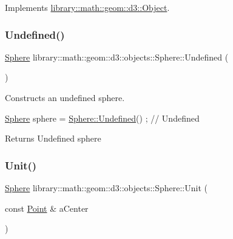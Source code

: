 Implements \hyperlink{classlibrary_1_1math_1_1geom_1_1d3_1_1_object_aa166f4ce4d116a248f0fc861c75012ca}{library\+::math\+::geom\+::d3\+::\+Object}.

\mbox{\label{classlibrary_1_1math_1_1geom_1_1d3_1_1objects_1_1_sphere_a777600f8814a2879e925909f30cfe9c4}} 
\subsubsection{\texorpdfstring{Undefined()}{Undefined()}}
{\footnotesize\ttfamily \hyperlink{classlibrary_1_1math_1_1geom_1_1d3_1_1objects_1_1_sphere}{Sphere} library\+::math\+::geom\+::d3\+::objects\+::\+Sphere\+::\+Undefined (\begin{DoxyParamCaption}{ }\end{DoxyParamCaption})\hspace{0.3cm}{\ttfamily [static]}}



Constructs an undefined sphere. 


\begin{DoxyCode}
\hyperlink{classlibrary_1_1math_1_1geom_1_1d3_1_1objects_1_1_sphere_a55dccc8ea16ee55cd7694c26afa8ea39}{Sphere} sphere = \hyperlink{classlibrary_1_1math_1_1geom_1_1d3_1_1objects_1_1_sphere_a777600f8814a2879e925909f30cfe9c4}{Sphere::Undefined}() ; \textcolor{comment}{// Undefined}
\end{DoxyCode}


\begin{DoxyReturn}{Returns}
Undefined sphere 
\end{DoxyReturn}
\mbox{\label{classlibrary_1_1math_1_1geom_1_1d3_1_1objects_1_1_sphere_a5464ea9145425db63dedbd896d6c97b0}} 
\subsubsection{\texorpdfstring{Unit()}{Unit()}}
{\footnotesize\ttfamily \hyperlink{classlibrary_1_1math_1_1geom_1_1d3_1_1objects_1_1_sphere}{Sphere} library\+::math\+::geom\+::d3\+::objects\+::\+Sphere\+::\+Unit (\begin{DoxyParamCaption}\item[{const \hyperlink{classlibrary_1_1math_1_1geom_1_1d3_1_1objects_1_1_point}{Point} \&}]{a\+Center }\end{DoxyParamCaption})\hspace{0.3cm}{\ttfamily [static]}}



